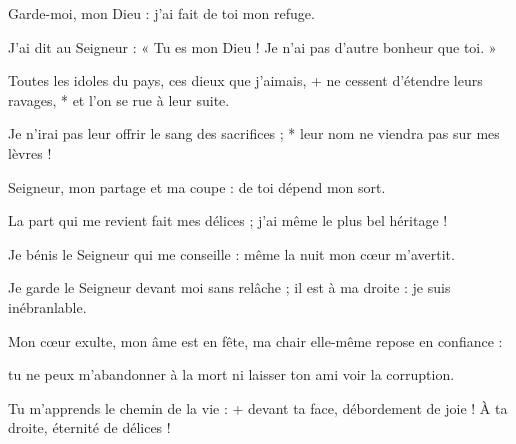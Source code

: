 \item Garde-moi, mon Dieu :
j'ai fait de toi mon refuge.

\item J'ai dit au Seigneur : « Tu es mon Dieu !
Je n'ai pas d'autre bonheur que toi. »

\item Toutes les idoles du pays,
   ces dieux que j'aimais, +
ne cessent d'étendre leurs ravages, *
et l'on se rue à leur suite.

\item Je n'irai pas leur offrir le sang des sacrifices ; *
leur nom ne viendra pas sur mes lèvres !

\item Seigneur, mon partage et ma coupe :
de toi dépend mon sort.

\item La part qui me revient fait mes délices ;
j'ai même le plus bel héritage !

\item Je bénis le Seigneur qui me conseille :
même la nuit mon cœur m'avertit.

\item Je garde le Seigneur devant moi sans relâche ;
il est à ma droite : je suis inébranlable.

\item Mon cœur exulte, mon âme est en fête,
ma chair elle-même repose en confiance :

\item tu ne peux m'abandonner à la mort
ni laisser ton ami voir la corruption.

\item Tu m'apprends le chemin de la vie : +
devant ta face, débordement de joie !
À ta droite, éternité de délices !